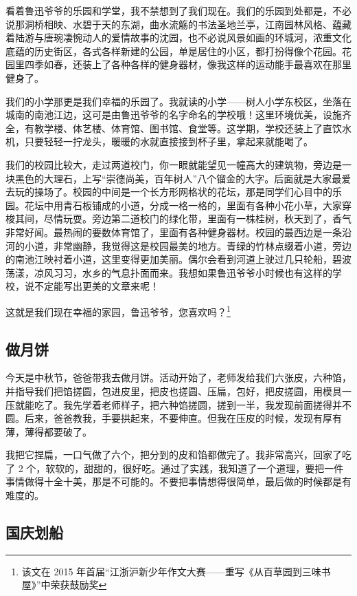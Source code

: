 \documentclass[UTF8,a4paper,titlepage,twoside,10.5pt]{article}
\begin{document}
看着鲁迅爷爷的乐园和学堂，我不禁想到了我们现在。我们的乐园到处都是，不必说那洞桥相映、水碧于天的东湖，曲水流觞的书法圣地兰亭，江南园林风格、蕴藏着陆游与唐琬凄惋动人的爱情故事的沈园，也不必说风景如画的环城河，浓重文化底蕴的历史街区，各式各样新建的公园，单是居住的小区，都打扮得像个花园。花园里四季如春，还装上了各种各样的健身器材，像我这样的运动能手最喜欢在那里健身了。

我们的小学那更是我们幸福的乐园了。我就读的小学——树人小学东校区，坐落在城南的南池江边，这可是由鲁迅爷爷的名字命名的学校哦！这里环境优美，设施齐全，有教学楼、体艺楼、体育馆、图书馆、食堂等。这学期，学校还装上了直饮水机，只要轻轻一拧龙头，暖暖的水就直接接到杯子里，拿起来就能喝了。

我们的校园比较大，走过两道校门，你一眼就能望见一幢高大的建筑物，旁边是一块黑色的大理石，上写“崇德尚美，百年树人”八个镏金的大字。后面就是大家最爱去玩的操场了。校园的中间是一个长方形网格状的花坛，那是同学们心目中的乐园。花坛中用青石板铺成的小道，分成一格一格的，里面有各种小花小草，大家穿梭其间，尽情玩耍。旁边第二道校门的绿化带，里面有一株桂树，秋天到了，香气非常好闻。最热闹的要数体育馆了，里面有各种健身器材。校园的最西边是一条沿河的小道，非常幽静，我觉得这是校园最美的地方。青绿的竹林点缀着小道，旁边的南池江映衬着小道，这里变得更加美丽。偶尔会看到河道上驶过几只轮船，碧波荡漾，凉风习习，水乡的气息扑面而来。我想如果鲁迅爷爷小时候也有这样的学校，说不定能写出更美的文章来呢！

这就是我们现在幸福的家园，鲁迅爷爷，您喜欢吗？\footnote{该文在 2015 年首届“江浙沪新少年作文大赛——重写《从百草园到三味书屋》”中荣获鼓励奖}

\subsection{做月饼}
\label{sec:orga7954c7}

今天是中秋节，爸爸带我去做月饼。活动开始了，老师发给我们六张皮，六种馅，并指导我们把馅搓圆，包进皮里，把皮也搓圆、压扁，包好，把皮搓圆，用模具一压就能吃了。我先学着老师样子，把六种馅搓圆，搓到一半，我发现前面搓得并不圆。后来，爸爸教我，手要拱起来，不要伸直。但我在压皮的时候，发现有厚有薄，薄得都要破了。

我把它捏扁，一口气做了六个，把分到的皮和馅都做完了。我非常高兴，回家了吃了 2 个，软软的，甜甜的，很好吃。通过了实践，我知道了一个道理，要把一件事情做得十全十美，那是不可能的。不要把事情想得很简单，最后做的时候都是有难度的。

\subsection{国庆划船}
\label{sec:org2cd4640}
\end{document}
